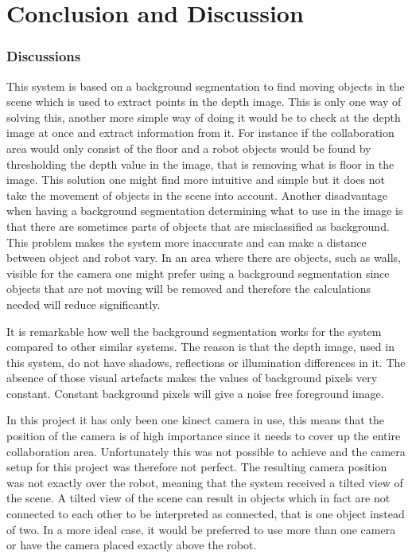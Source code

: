 \section{Conclusion and Discussion}  

\subsubsection{Discussions}
This system is based on a background segmentation to find moving objects in the scene which is used to extract points in the depth image. This is only one way of solving this, another more simple way of doing it would be to check at the depth image at once and extract information from it. For instance if the collaboration area would only consist of the floor and a robot objects would be found by thresholding the depth value in the image, that is removing what is floor in the image. This solution one might find more intuitive and simple but it does not take the movement of objects in the scene into account. Another disadvantage when having a background segmentation determining what to use in the image is that there are sometimes parts of objects that are misclassified as background. This problem makes the system more inaccurate and can make a distance between object and robot vary. In an area where there are objects, such as walls, visible for the camera one might prefer using a background segmentation since objects that are not moving will be removed and therefore the calculations needed will reduce significantly.   

It is remarkable how well the background segmentation works for the system compared to other similar systems. The reason is that the depth image, used in this system, do not have shadows, reflections or illumination differences in it. The absence of those visual artefacts makes the values of background pixels very constant. Constant background pixels will give a noise free foreground image. 

In this project it has only been one kinect camera in use, this means that the position of the camera is of high importance since it needs to cover up the entire collaboration area. Unfortunately this was not possible to achieve and the camera setup for this project was therefore not perfect. The resulting camera position was not exactly over the robot, meaning that the system received a tilted view of the scene. A tilted view of the scene can result in objects which in fact are not connected to each other to be interpreted as connected, that is one object instead of two. In a more ideal case, it would be preferred to use more than one camera or have the camera placed exactly above the robot.

